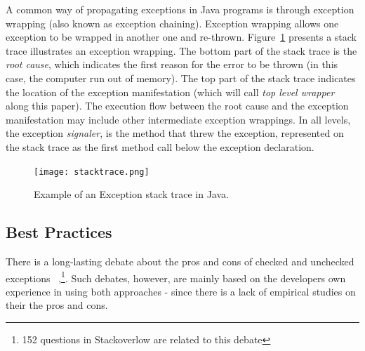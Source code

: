 \documentclass[conference]{IEEEtran}
\begin{document}
 A common way of  propagating exceptions in Java programs is through exception wrapping
 (also known as exception chaining). Exception wrapping allows one exception 
to be wrapped in another one and re-thrown. Figure~\ref{fig:wrapping} presents 
a stack trace  illustrates an exception wrapping. The bottom 
part of the stack trace is the \emph{root cause}, which indicates the
first reason for the error to be thrown (in this case, the computer run out of
memory). The top part of the stack trace indicates the location of the exception
manifestation (which will call \emph{top level wrapper} along this paper). The
execution flow  between the root cause and the exception manifestation may
include other intermediate exception wrappings. In all levels, the exception
\emph{signaler}, is the method that threw the exception, represented on the
stack trace as the first method call below the exception declaration.

\begin{figure} \centering \texttt{[image: stacktrace.png]}
\caption{Example of an Exception stack trace in Java.}
\label{fig:wrapping}
\end{figure}



\subsection{Best Practices}
\label{sec:best}

There is a long-lasting debate about the pros and cons of checked and unchecked exceptions 
~\cite{javatut,stackoverlow,debate},\footnote{152 questions in Stackoverlow
are related to this debate}. Such debates, however, are mainly based on the developers own experience in
using both approaches - since there is a lack of empirical studies on their the pros and cons.
\end{document}
